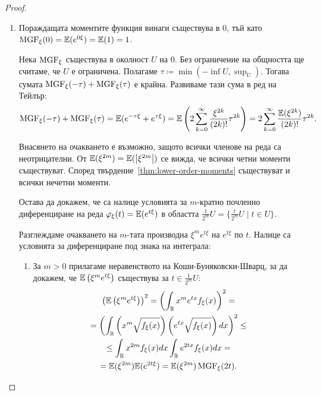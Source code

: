 \documentclass[numbers=endperiod, DIV=15, bibliography=totocnumbered]{scrartcl}
\begin{document}
\begin{proof}
  \mbox{}
  \begin{enumerate}
    \item Пораждащата моментите функция винаги съществува в $0$, тъй като $\operatorname{MGF}_\xi(0) = \mathbb{E}(e^{0\xi}) = \mathbb{E}(1) = 1$.

    Нека $\operatorname{MGF}_\xi$ съществува в околност $U$ на $0$. Без ограничение на общността ще считаме, че $U$ е ограничена. Полагаме $\tau \coloneqq \min(-\inf U, \sup_U)$. Тогава сумата $\operatorname{MGF}_\xi(-\tau) + \operatorname{MGF}_\xi(\tau)$ е крайна. Развиваме тази сума в ред на Тейлър:
    \begin{displaymath}
      \operatorname{MGF}_\xi(-\tau) + \operatorname{MGF}_\xi(\tau)
      =
      \mathbb{E}(e^{-\tau\xi} + e^{\tau\xi})
      =
      \mathbb{E}\left( 2 \sum_{k=0}^\infty \frac {\xi^{2k}} {(2k)!} \tau^{2k} \right)
      =
      2 \sum_{k=0}^\infty \frac {\mathbb{E}(\xi^{2k})} {(2k)!} \tau^{2k}.
    \end{displaymath}

    Внасянето на очакването е възможно, защото всички членове на реда са неотрицателни. От $\mathbb{E}(\xi^{2m}) = \mathbb{E}(\left\vert \xi^{2m} \right\vert)$ се вижда, че всички четни моменти съществуват. Според твърдение~\ref{thm:lower-order-moments} съществуват и всички нечетни моменти.

    Остава да докажем, че са налице условията за $m$-кратно почленно диференциране на реда $\varphi_\xi(t) = \mathbb{E} (e^{t\xi})$ в областта $\frac 1 {2^m} U = \{ \frac t {2^m} U \mid t \in U \}$.

    Разглеждаме очакването на $m$-тата производна $\xi^m e^{t \xi}$ на $e^{t \xi}$ по $t$. Налице са условията за диференциране под знака на интеграла:
    \begin{enumerate}
      \item За $m > 0$ прилагаме неравенството на Коши-Буняковски-Шварц, за да докажем, че $\mathbb{E} \left( \xi^m e^{t \xi} \right)$ съществува за $t \in \frac 1 {2^m} U$:
      \begin{multline*}
        {\left(\mathbb{E}\left( \xi^m e^{t \xi} \right) \right)}^2
        =
        {\left(\int_{\mathbb{R}} x^m e^{t x} f_\xi(x) \right)}^2
        = \\ =
        {\left(\int_{\mathbb{R}} \left(x^m \sqrt{f_\xi(x)} \right) \left(e^{t x} \sqrt{f_\xi(x)} \right) dx \right)}^2
        \leq \\ \leq
        \int_{\mathbb{R}} x^{2m} f_\xi(x) dx
        \int_{\mathbb{R}} e^{2tx} f_\xi(x) dx
        = \\ =
        \mathbb{E}(\xi^{2m})
        \mathbb{E}(e^{2t \xi})
        =
        \mathbb{E}(\xi^{2m})
        \operatorname{MGF}_\xi(2t).
      \end{multline*}


\end{enumerate}
\end{enumerate}
\end{proof}
\end{document}
